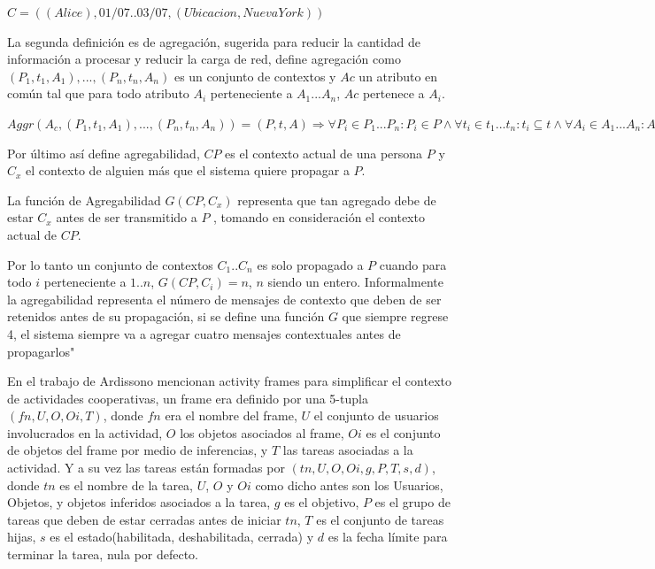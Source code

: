 $C=( ( Alice ), 01/07..03/07, ( Ubicacion, Nueva York ))$

La segunda definici\'on es de agregaci\'on, sugerida para reducir la cantidad de informaci\'on a procesar y reducir la carga de red, define agregaci\'on como ${ ( P_{1},t_{1},A_{1} ),..., ( P_{n},t_{n},A_{n} ) }$ es un conjunto de contextos y $Ac$ un atributo en com\'un tal que para todo atributo $A_{i}$ perteneciente a $A_{1} ... A_{n}$, $Ac$ pertenece a $A_{i}$.

$Aggr( A_{c}, {( P_{1},t_{1},A_{1} ),..., ( P_{n},t_{n},A_{n} )}) = ( P, t, A )\Rightarrow \forall P_{i}\in P_{1}...P_{n}:P_{i}\in P \wedge \forall t_{i} \in t_{1}...t_{n}:t_{i}\subseteq t \wedge \forall A_{i}\in A_{1}...A_{n}:A_{i}\in A$

Por \'ultimo as\'i define agregabilidad, $CP$ es el contexto actual de una persona $P$ y $C_{x}$ el contexto de alguien m\'as que el sistema quiere propagar a $P$.

La funci\'on de Agregabilidad $G( CP, C_{x} )$ representa que tan agregado debe de estar $C_{x}$ antes de ser transmitido a $P$ , tomando en consideraci\'on el contexto actual de $CP$.

Por lo tanto un conjunto de contextos $C_{1}..C_{n}$ es solo propagado a $P$ cuando para todo $i$ perteneciente a $1..n$, $G( CP, C_{i} ) = n$, $n$ siendo un entero. Informalmente la agregabilidad representa el n\'umero de mensajes de contexto que deben de ser retenidos antes de su propagaci\'on, si se define una funci\'on $G$ que siempre regrese 4, el sistema siempre va a agregar cuatro mensajes contextuales antes de propagarlos"

En el trabajo de Ardissono \cite{ardissono2012context} mencionan activity frames para simplificar el contexto de actividades cooperativas, un frame era definido por una 5-tupla $( fn, U, O, Oi, T )$, donde $fn$ era el nombre del frame, $U$ el conjunto de usuarios involucrados en la actividad, $O$ los objetos asociados al frame, $Oi$ es el conjunto de objetos del frame por medio de inferencias, y $T$ las tareas asociadas a la actividad. Y a su vez las tareas est\'an formadas por $( tn, U, O, Oi, g, P, T, s, d )$, donde $tn$ es el nombre de la tarea, $U$, $O$ y $Oi$ como dicho antes son los Usuarios, Objetos, y objetos inferidos asociados a la tarea, $g$ es el objetivo, $P$ es el grupo de tareas que deben de estar cerradas antes de iniciar $tn$, $T$ es el conjunto de tareas hijas, $s$ es el estado(habilitada, deshabilitada, cerrada) y $d$ es la fecha l\'imite para terminar la tarea, nula por defecto.

